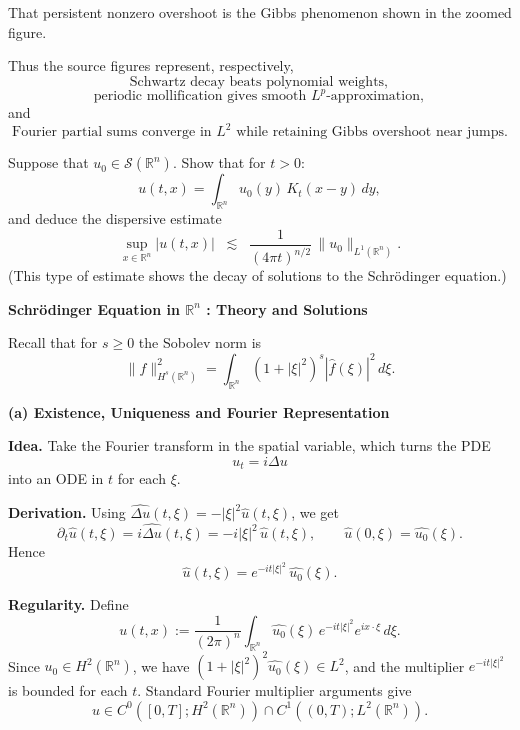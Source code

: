 \begin{solution}
That persistent nonzero overshoot is the Gibbs phenomenon shown in the
zoomed figure.

Thus the source figures represent, respectively,
\[
\boxed{
\text{Schwartz decay beats polynomial weights},
}
\]
\[
\boxed{
\text{periodic mollification gives smooth }L^p\text{-approximation},
}
\]
and
\[
\boxed{
\text{Fourier partial sums converge in }L^2
\text{ while retaining Gibbs overshoot near jumps}.}
\]
\end{solution}


\begin{problem}[CP-III-0019]
\label{prob:cp-iii-0019}
Suppose that $u_0 \in \mathscr{S}(\mathbb{R}^n)$.
	Show that for $t>0$:
	\[
	u(t,x) = \int_{\mathbb{R}^n} u_0(y)\, K_t(x-y)\, dy,
	\]
	and deduce the dispersive estimate
	\[
	\sup_{x\in\mathbb{R}^n} |u(t,x)|
	\;\;\lesssim\;\;
	\frac{1}{(4\pi t)^{n/2}}\, \|u_0\|_{L^1(\mathbb{R}^n)}.
	\]
	(This type of estimate shows the decay of solutions to the Schrödinger equation.)


\par\medskip\noindent\textbf{Schrödinger Equation in $\mathbb{R}^n$ : Theory and Solutions}\quad

Recall that for $s\ge 0$ the Sobolev norm is
\[
\|f\|_{H^s(\mathbb{R}^n)}^2
= \int_{\mathbb{R}^n} (1+|\xi|^2)^s |\widehat{f}(\xi)|^2\,d\xi.
\]

\par\smallskip\noindent\textbf{(a) \; Existence, Uniqueness and Fourier Representation}\quad

\par\smallskip\noindent\textbf{\textbf{Idea.}}\quad
Take the Fourier transform in the spatial variable, which turns the PDE
\[
u_t = i\Delta u
\]
into an ODE in $t$ for each $\xi$.

\par\smallskip\noindent\textbf{\textbf{Derivation.}}\quad
Using $\widehat{\Delta u}(t,\xi) = -|\xi|^2\widehat{u}(t,\xi)$, we get
\[
\partial_t \widehat{u}(t,\xi) = i\widehat{\Delta u}(t,\xi)
= -i|\xi|^2\,\widehat{u}(t,\xi), \qquad
\widehat{u}(0,\xi) = \widehat{u_0}(\xi).
\]
Hence
\[
\widehat{u}(t,\xi)
= e^{-it|\xi|^2}\,\widehat{u_0}(\xi).
\]

\par\smallskip\noindent\textbf{\textbf{Regularity.}}\quad
Define
\[
u(t,x)
:= \frac{1}{(2\pi)^n} \int_{\mathbb{R}^n}
\widehat{u_0}(\xi)\,e^{-it|\xi|^2} e^{ix\cdot\xi}\,d\xi.
\]
Since $u_0\in H^2(\mathbb{R}^n)$, we have
$(1+|\xi|^2)^2\widehat{u_0}(\xi)\in L^2$, and the multiplier
$e^{-it|\xi|^2}$ is bounded for each $t$. Standard Fourier multiplier
arguments give
\[
u \in C^0([0,T];H^2(\mathbb{R}^n))
\cap C^1((0,T);L^2(\mathbb{R}^n)).
\]


\end{problem}
